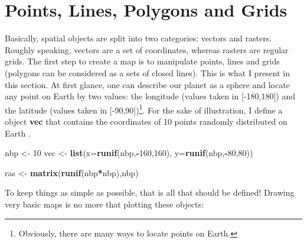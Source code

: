 \documentclass[]{report}
\newenvironment{Shaded}{\begin{snugshade}}{\end{snugshade}}
\newcommand{\DataTypeTok}[1]{\textcolor[rgb]{0.13,0.29,0.53}{#1}}
\newcommand{\DecValTok}[1]{\textcolor[rgb]{0.00,0.00,0.81}{#1}}
\newcommand{\KeywordTok}[1]{\textcolor[rgb]{0.13,0.29,0.53}{\textbf{#1}}}
\newcommand{\NormalTok}[1]{#1}
\newcommand{\OperatorTok}[1]{\textcolor[rgb]{0.81,0.36,0.00}{\textbf{#1}}}
\newcommand{\StringTok}[1]{\textcolor[rgb]{0.31,0.60,0.02}{#1}}
\let\rmarkdownfootnote\footnote%
\def\footnote{\protect\rmarkdownfootnote}
\begin{document}
\hypertarget{points-lines-polygons-and-grids}{%
\chapter{Points, Lines, Polygons and
Grids}\label{points-lines-polygons-and-grids}}

Basically, spatial objects are split into two categories: vectors and
rasters. Roughly speaking, vectors are a set of coordinates, whereas
rasters are regular grids. The first step to create a map is to
manipulate points, lines and grids (polygons can be considered as a sets
of closed lines). This is what I present in this section. At first
glance, one can describe our planet as a sphere and locate any point on
Earth by two values: the longitude (values taken in {[}-180,180{]}) and
the latitude (values taken in {[}-90,90{]})\footnote{Obviously, there
  are many ways to locate points on Earth.}. For the sake of
illustration, I define a object \textbf{vec} that contains the
coordinates of 10 points randomly distributed on Earth .

\begin{Shaded}
\begin{Highlighting}[]
\NormalTok{nbp <-}\StringTok{ }\DecValTok{10}
\NormalTok{vec <-}\StringTok{ }\KeywordTok{list}\NormalTok{(}\DataTypeTok{x=}\KeywordTok{runif}\NormalTok{(nbp,}\OperatorTok{-}\DecValTok{160}\NormalTok{,}\DecValTok{160}\NormalTok{), }\DataTypeTok{y=}\KeywordTok{runif}\NormalTok{(nbp,}\OperatorTok{-}\DecValTok{80}\NormalTok{,}\DecValTok{80}\NormalTok{))}
\end{Highlighting}
\end{Shaded}

\begin{Shaded}
\begin{Highlighting}[]
\NormalTok{ras <-}\StringTok{ }\KeywordTok{matrix}\NormalTok{(}\KeywordTok{runif}\NormalTok{(nbp}\OperatorTok{*}\NormalTok{nbp),nbp)}
\end{Highlighting}
\end{Shaded}

To keep things as simple as possible, that is all that should be
defined! Drawing very basic maps is no more that plotting these objects:
\end{document}
